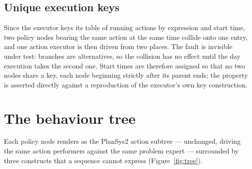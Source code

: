 \documentclass[11pt,a4paper]{article}
\theoremstyle{definition}
\begin{document}
\subsection{Unique execution keys}
\label{sec:keys}

Since the executor keys its table of running actions by expression and start
time, two policy nodes bearing the same action at the same time collide onto one
entry, and one action executor is then driven from two places. The fault is
invisible under test: branches are alternatives, so the collision has no effect
until the day execution takes the second one. Start times are therefore assigned
so that no two nodes share a key, each node beginning strictly after its parent
ends; the property is asserted directly against a reproduction of the executor's
own key construction.

\section{The behaviour tree}
\label{sec:tree}

Each policy node renders as the PlanSys2 action subtree --- unchanged, driving
the same action performers against the same problem expert --- surrounded by
three constructs that a sequence cannot express (Figure~\ref{fig:tree}).
\end{document}
